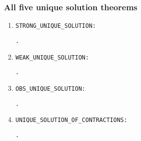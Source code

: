 \begin{frame}
\frametitle{All five unique solution theorems}
\begin{small}
\begin{enumerate}
\item \texttt{STRONG_UNIQUE_SOLUTION:}
\begin{alltt}
\HOLTokenTurnstile{}   \HOLSymConst{\HOLTokenImp{}} \HOLSymConst{\HOLTokenForall{}} .  \HOLSymConst{\HOLTokenStrongEQ}   \HOLSymConst{\HOLTokenConj{}}  \HOLSymConst{\HOLTokenStrongEQ}   \HOLSymConst{\HOLTokenImp{}}  \HOLSymConst{\HOLTokenStrongEQ} 
\end{alltt}
\item \texttt{WEAK_UNIQUE_SOLUTION:}
\begin{alltt}
\HOLTokenTurnstile{}   \HOLSymConst{\HOLTokenConj{}}   \HOLSymConst{\HOLTokenImp{}} \HOLSymConst{\HOLTokenForall{}} .  \HOLSymConst{\HOLTokenWeakEQ}   \HOLSymConst{\HOLTokenConj{}}  \HOLSymConst{\HOLTokenWeakEQ}   \HOLSymConst{\HOLTokenImp{}}  \HOLSymConst{\HOLTokenWeakEQ} 
\end{alltt}
\item \texttt{OBS_UNIQUE_SOLUTION:}
\begin{alltt}
\HOLTokenTurnstile{}   \HOLSymConst{\HOLTokenConj{}}   \HOLSymConst{\HOLTokenImp{}} \HOLSymConst{\HOLTokenForall{}} .  \HOLSymConst{\HOLTokenObsCongr}   \HOLSymConst{\HOLTokenConj{}}  \HOLSymConst{\HOLTokenObsCongr}   \HOLSymConst{\HOLTokenImp{}}  \HOLSymConst{\HOLTokenObsCongr} 
\end{alltt}
\item \texttt{UNIQUE_SOLUTION_OF_CONTRACTIONS:}
\begin{alltt}
\HOLTokenTurnstile{}   \HOLSymConst{\HOLTokenImp{}} \HOLSymConst{\HOLTokenForall{}} .  \HOLSymConst{\HOLTokenContracts{}}   \HOLSymConst{\HOLTokenConj{}}  \HOLSymConst{\HOLTokenContracts{}}   \HOLSymConst{\HOLTokenImp{}}  \HOLSymConst{\HOLTokenWeakEQ} 

\end{alltt}
\end{enumerate}
\end{small}
\end{frame}
